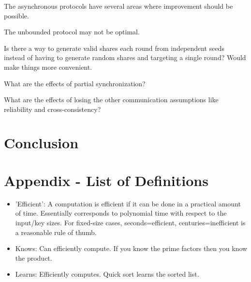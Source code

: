 \documentclass{dalcsthesis}
\begin{document}
The asynchronous protocols have several areas where improvement should be possible.

The unbounded protocol may not be optimal.

Is there a way to generate valid shares each round from independent seeds instead of having to generate random shares and targeting a single round? Would make things more convenient.

What are the effects of partial synchronization?

What are the effects of losing the other communication assumptions like reliability and cross-consistency?




\chapter{Conclusion}



\chapter{Appendix - List of Definitions}

\begin{itemize}
  \item 'Efficient': A computation is efficient if it can be done in a practical amount of time. Essentially corresponds to polynomial time with respect to the input/key sizes. For fixed-size cases, seconds=efficient, centuries=inefficient is a reasonable rule of thumb.
  \item Knows: Can efficiently compute. If you know the prime factors then you know the product.
  \item Learns: Efficiently computes. Quick sort learns the sorted list.
\end{itemize}



\end{document}
